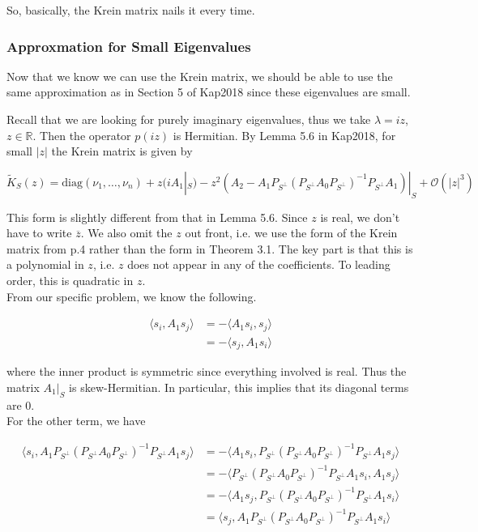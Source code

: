 \documentclass[12pt]{article}
\def\R{{\mathbb R}}
\begin{document}
So, basically, the Krein matrix nails it every time.\\

\subsubsection{Approxmation for Small Eigenvalues}

Now that we know we can use the Krein matrix, we should be able to use the same approximation as in Section 5 of Kap2018 since these eigenvalues are small.

Recall that we  are looking for purely imaginary eigenvalues, thus we take $\lambda = i z$, $z \in \R$. Then the operator $p(iz)$ is Hermitian. By Lemma 5.6 in Kap2018, for small $|z|$ the Krein matrix is given by

\begin{equation}
\tilde{K}_S(z) = \text{diag}(\nu_1, \dots, \nu_n) + z(i A_1|_S) - z^2\left( A_2 - A_1 P_{S^\perp} (P_{S^\perp} A_0 P_{S^\perp})^{-1} P_{S^\perp} A_1 \right)|_S + \mathcal{O}(|z|^3)
\end{equation}

This form is slightly different from that in Lemma 5.6. Since $z$ is real, we don't have to write $\overline{z}$. We also omit the $z$ out front, i.e. we use the form of the Krein matrix from p.4 rather than the form in Theorem 3.1. The key part is that this is a polynomial in $z$, i.e. $z$ does not appear in any of the coefficients. To leading order, this is quadratic in $z$.\\

From our specific problem, we know the following.

\begin{align*}
\langle s_i, A_1 s_j \rangle &= -\langle A_1 s_i, s_j \rangle \\
&= -\langle s_j, A_1 s_i \rangle
\end{align*}

where the inner product is symmetric since everything involved is real. Thus the matrix $A_1|_S$ is skew-Hermitian. In particular, this implies that its diagonal terms are 0.\\

For the other term, we have

\begin{align*}
\langle s_i, A_1 P_{S^\perp} (P_{S^\perp} A_0 P_{S^\perp})^{-1} P_{S^\perp} A_1 s_j \rangle &= -\langle A_1 s_i, P_{S^\perp} (P_{S^\perp} A_0 P_{S^\perp})^{-1} P_{S^\perp} A_1 s_j \rangle \\
&= -\langle P_{S^\perp} (P_{S^\perp} A_0 P_{S^\perp})^{-1} P_{S^\perp} A_1 s_i, A_1 s_j \rangle \\
&= -\langle A_1 s_j, P_{S^\perp} (P_{S^\perp} A_0 P_{S^\perp})^{-1} P_{S^\perp} A_1 s_i \rangle \\
&= \langle s_j, A_1 P_{S^\perp} (P_{S^\perp} A_0 P_{S^\perp})^{-1} P_{S^\perp} A_1 s_i \rangle
\end{align*}
\end{document}
